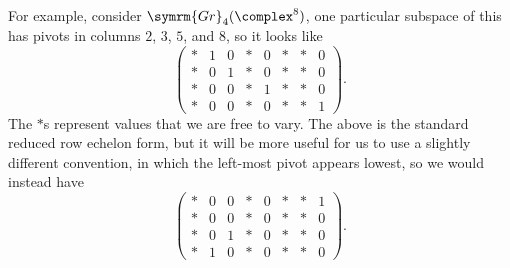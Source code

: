 \documentclass[fleqn]{NotesClass}
\newcommand{\Gr}{\symrm{Gr}}
\begin{document}
    For example, consider \(\Gr_4(\complex^8)\), one particular subspace of this has pivots in columns \(2\), \(3\), \(5\), and \(8\), so it looks like
    \begin{equation}
        \begin{pmatrix}
            * & 1 & 0 & * & 0 & * & * & 0\\
            * & 0 & 1 & * & 0 & * & * & 0\\
            * & 0 & 0 & * & 1 & * & * & 0\\
            * & 0 & 0 & * & 0 & * & * & 1
        \end{pmatrix}
        .
    \end{equation}
    The \(*\)s represent values that we are free to vary.
    The above is the standard reduced row echelon form, but it will be more useful for us to use a slightly different convention, in which the left-most pivot appears lowest, so we would instead have
    \begin{equation}
        \begin{pmatrix}
            * & 0 & 0 & * & 0 & * & * & 1\\
            * & 0 & 0 & * & 0 & * & * & 0\\
            * & 0 & 1 & * & 0 & * & * & 0\\
            * & 1 & 0 & * & 0 & * & * & 0
        \end{pmatrix}
        .
    \end{equation}
    
\end{document}

